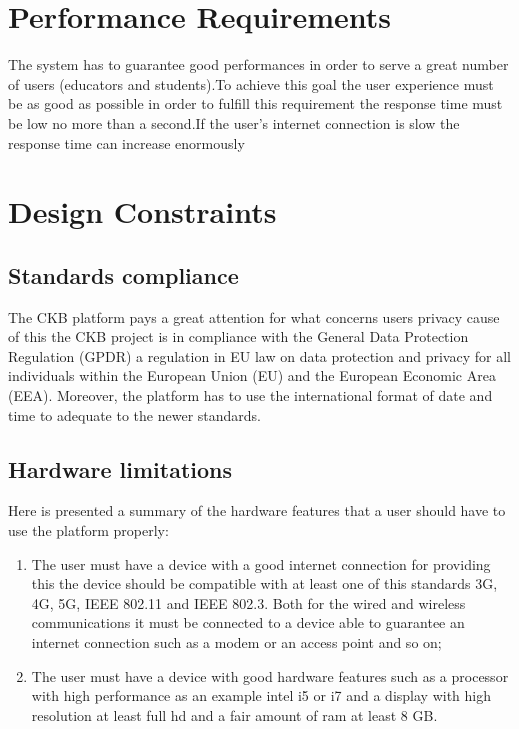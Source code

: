 \begin{enumerate}[label=\textbf{[UC\arabic*]}]
\section{Performance Requirements}
The system has to guarantee good performances in order to serve a great number of users (educators and students).To achieve this goal the user experience must be as good as possible in order to fulfill this requirement the response time must be low no more than a second.If the user’s internet connection is slow the response time can increase  enormously

\section{Design Constraints}

\subsection{Standards compliance}
The CKB platform pays a great attention for what concerns users privacy cause of this the CKB project is in compliance with the  General Data Protection Regulation
(GPDR) a regulation in EU law on data protection and privacy for all
individuals within the European Union (EU) and the European Economic Area (EEA).
Moreover, the platform has to use the international format of date and time to adequate to the newer standards.
\subsection{Hardware limitations}
Here is presented a summary of the hardware features that a user should have to use the platform properly:
    \begin{enumerate}[label=\textbullet]
        \item The user must have a device with a good internet connection for providing this the device should be compatible with at least one of this standards 3G, 4G, 5G, IEEE 802.11 and  IEEE 802.3. Both for the wired and wireless communications it must be connected to a device able to guarantee an internet connection such as a modem or an access point and so on;
        \item The user must have a device with good hardware features such as a processor with high performance as an example intel i5 or i7 and a display with high resolution at least full hd and a fair amount of ram at least 8 GB.
        
    \end{enumerate}




\end{enumerate}
